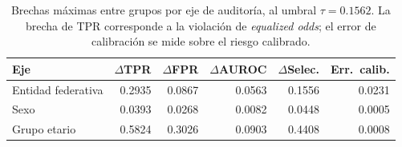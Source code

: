 
\begin{table}[htbp]
\centering
\caption{Brechas máximas entre grupos por eje de auditoría, al umbral
$\tau=0.1562$. La brecha de TPR corresponde a la violación de
\emph{equalized odds}; el error de calibración se mide sobre el riesgo calibrado.}
\label{tab:disparidad}
\small\setlength{\tabcolsep}{5pt}
\begin{tabular}{l r r r r r}
\toprule
Eje & $\Delta$TPR & $\Delta$FPR & $\Delta$AUROC & $\Delta$Selec. & Err.\ calib. \\
\midrule
Entidad federativa & 0.2935 & 0.0867 & 0.0563 & 0.1556 & 0.0231 \\
Sexo & 0.0393 & 0.0268 & 0.0082 & 0.0448 & 0.0005 \\
Grupo etario & 0.5824 & 0.3026 & 0.0903 & 0.4408 & 0.0008 \\
\bottomrule
\end{tabular}
\end{table}
